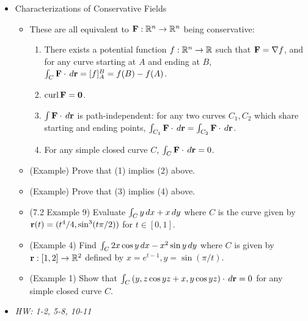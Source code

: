 \documentclass[11pt]{article}
\begin{document}
\begin{itemize}
  \item Characterizations of Conservative Fields
    \begin{itemize}
      \item These are all equivalent to \(\mathbf{F}:\mathbb R^n\to\mathbb R^n\)
        being conservative:
        \begin{enumerate}[(1)]
          \item There exists a potential function \(f:\mathbb R^n\to\mathbb R\) such
            that \(\mathbf{F}=\nabla f\), and
            for any curve starting at \(A\) and ending at \(B\),
            \(\int_C\mathbf{F}\cdot\,d\mathbf{r}=[f]_A^B=f(B)-f(A)\).
          \item \(\textrm{curl}\, \mathbf{F}=\mathbf{0}\).
          \item \(\int \mathbf{F}\cdot\,d\mathbf{r}\)
            is path-independent: for any two curves \(C_1,C_2\)
            which share starting and ending points,
            \(
              \int_{C_1}\mathbf{F}\cdot\,d\mathbf{r}
                =
              \int_{C_2}\mathbf{F}\cdot\,d\mathbf{r}
            \).
          \item For any simple closed curve \(C\),
            \(\int_C\mathbf{F}\cdot\,d\mathbf{r}=0\).
        \end{enumerate}
      \item (Example) Prove that (1) implies (2) above.
      \item (Example) Prove that (3) implies (4) above.
      \item (7.2 Example 9) Evaluate \(\int_C y\,d x+x\,d y\) where
        \(C\) is the curve given by \(\mathbf{r}(t)=(t^4/4,\sin^3(t\pi/2))\)
        for \(t\in[0,1]\).
      \item (Example 4) Find \(\int_C 2x\cos y\,d x-x^2\sin y\,d y\)
        where \(C\) is given by \(\mathbf{r}:[1,2]\to\mathbb R^2\) defined by
        \(x=e^{t-1},y=\sin(\pi/t)\).
      \item (Example 1) Show that
        \(\int_C \left(y,z\cos yz+x,y\cos yz\right)\cdot\,d\mathbf{r}=0\) for any
        simple closed curve \(C\).
    \end{itemize}
  \item\textit{
    HW: 1-2, 5-8, 10-11
  }
\end{itemize}



\end{document}

